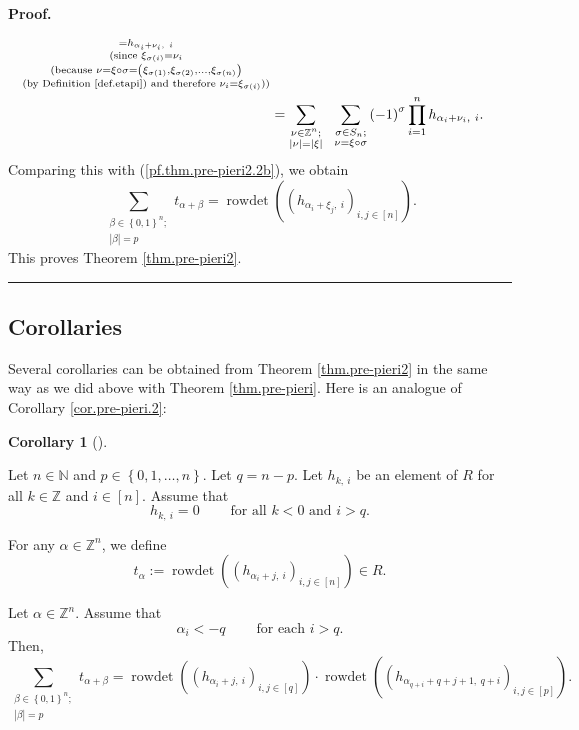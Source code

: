 \documentclass[numbers=enddot,12pt,final,onecolumn,notitlepage,english]{scrartcl}%
\theoremstyle{definition}
\newtheorem{coro}[theo]{Corollary}
\newenvironment{corollary}[1][]
{\begin{coro}[#1]\begin{leftbar}}
{\end{leftbar}\end{coro}}
\newenvironment{proof}[1][Proof]{\noindent\textbf{#1.} }{\ \rule{0.5em}{0.5em}}
\let\sumnonlimits\sum
\let\prodnonlimits\prod
\renewcommand{\sum}{\sumnonlimits\limits}
\renewcommand{\prod}{\prodnonlimits\limits}
\newenvironment{verlong}{}{}
\begin{document}
\begin{verlong}
\begin{proof}
\begin{align*}
_{\substack{=h_{\alpha_{i}+\nu_{i},\ i}\\\text{(since }\xi_{\sigma\left(
i\right)  }=\nu_{i}\\\text{(because }\nu=\xi\circ\sigma=\left(  \xi
_{\sigma\left(  1\right)  },\xi_{\sigma\left(  2\right)  },\ldots,\xi
_{\sigma\left(  n\right)  }\right)  \\\text{(by Definition \ref{def.etapi})
and therefore }\nu_{i}=\xi_{\sigma\left(  i\right)  }\text{))}}}\\
&  =\sum_{\substack{\nu\in\mathbb{Z}^{n};\\\left\vert \nu\right\vert
=\left\vert \xi\right\vert }}\ \ \sum_{\substack{\sigma\in S_{n};\\\nu
=\xi\circ\sigma}}\left(  -1\right)  ^{\sigma}\prod_{i=1}^{n}h_{\alpha_{i}%
+\nu_{i},\ i}.
\end{align*}
Comparing this with (\ref{pf.thm.pre-pieri2.2b}), we obtain%
\[
\sum_{\substack{\beta\in\left\{  0,1\right\}  ^{n};\\\left\vert \beta
\right\vert =p}}t_{\alpha+\beta}=\operatorname*{rowdet}\left(  \left(
h_{\alpha_{i}+\xi_{j},\ i}\right)  _{i,j\in\left[  n\right]  }\right)  .
\]
This proves Theorem \ref{thm.pre-pieri2}.
\end{proof}
\end{verlong}

\subsection{Corollaries}

Several corollaries can be obtained from Theorem \ref{thm.pre-pieri2} in the
same way as we did above with Theorem \ref{thm.pre-pieri}. Here is an analogue
of Corollary \ref{cor.pre-pieri.2}:

\begin{corollary}
\label{cor.pre-pieri2.2}Let $n\in\mathbb{N}$ and $p\in\left\{  0,1,\ldots
,n\right\}  $. Let $q=n-p$. Let $h_{k,\ i}$ be an element of $R$ for all
$k\in\mathbb{Z}$ and $i\in\left[  n\right]  $. Assume that%
\begin{equation}
h_{k,\ i}=0\ \ \ \ \ \ \ \ \ \ \text{for all }k<0\text{ and }i>q.
\label{eq.cor.pre-pieri2.2.ass}%
\end{equation}


For any $\alpha\in\mathbb{Z}^{n}$, we define%
\[
t_{\alpha}:=\operatorname*{rowdet}\left(  \left(  h_{\alpha_{i}+j,\ i}\right)
_{i,j\in\left[  n\right]  }\right)  \in R.
\]


Let $\alpha\in\mathbb{Z}^{n}$. Assume that%
\begin{equation}
\alpha_{i}<-q\ \ \ \ \ \ \ \ \ \ \text{for each }i>q.
\label{eq.cor.pre-pieri2.2.ass-minus}%
\end{equation}
Then,%
\[
\sum_{\substack{\beta\in\left\{  0,1\right\}  ^{n};\\\left\vert \beta
\right\vert =p}}t_{\alpha+\beta}=\operatorname*{rowdet}\left(  \left(
h_{\alpha_{i}+j,\ i}\right)  _{i,j\in\left[  q\right]  }\right)
\cdot\operatorname*{rowdet}\left(  \left(  h_{\alpha_{q+i}+q+j+1,\ q+i}%
\right)  _{i,j\in\left[  p\right]  }\right)  .
\]

\end{corollary}
\end{document}
